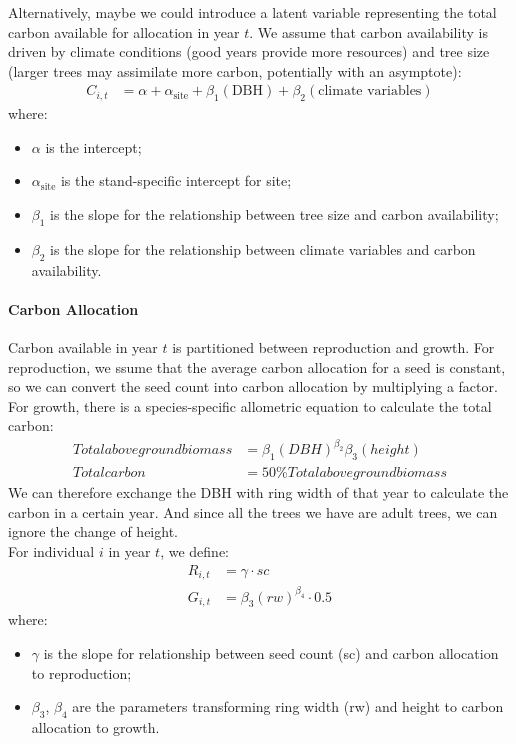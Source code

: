 \documentclass[11pt]{article}
\begin{document}
Alternatively, maybe we could introduce a latent variable representing the total carbon available for allocation in year $t$. We assume that carbon availability is driven by climate conditions (good years provide more resources) and tree size (larger trees may assimilate more carbon, potentially with an asymptote):
\begin{align}
C_{i,t} &=\alpha + \alpha_{\text{site}} +\beta_{1} (\text{DBH}) + \beta_{2} (\text{climate variables})
\end{align}
where:
\begin{itemize}
    \item $\alpha$ is the intercept;
    \item $\alpha_{\text{site}}$ is the stand-specific intercept for site;
    \item $\beta_{1}$ is the slope for the relationship between tree size and carbon availability;
    \item $\beta_{2}$ is the slope for the relationship between climate variables and carbon availability.
\end{itemize}

\paragraph{Carbon Allocation}

Carbon available in year $t$ is partitioned between reproduction and growth. For reproduction, we ssume that the average carbon allocation for a seed is constant, so we can convert the seed count into carbon allocation by multiplying a factor. For growth, there is a species-specific allometric equation to calculate the total carbon:
\begin{align}
Total aboveground biomass &= \beta_1(DBH)^{\beta_{2}} \beta_3(height)\\
Total carbon &= 50\%Total aboveground biomass
\end{align}
We can therefore exchange the DBH with ring width of that year to calculate the carbon in a certain year. And since all the trees we have are adult trees, we can ignore the change of height.\\

For individual $i$ in year $t$, we define:
\begin{align}
R_{i,t} &= \gamma \cdot sc \\
G_{i,t} &= \beta_{3} (rw)^{\beta_{4}} \cdot 0.5
\end{align}
where:
\begin{itemize}
    \item  $\gamma$ is the slope for relationship between seed count (sc) and carbon allocation to reproduction;
    \item $\beta_{3}$, $\beta_{4}$ are the parameters transforming ring width (rw) and height to carbon allocation to growth.
\end{itemize}
\end{document}
